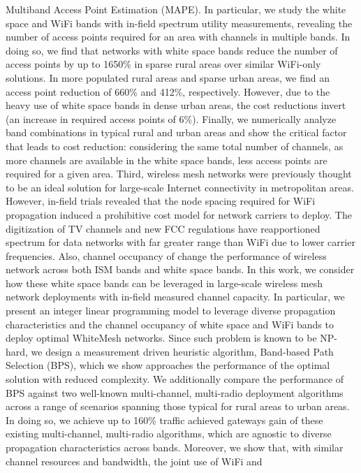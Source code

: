 Multiband Access Point Estimation (MAPE). In particular, we study the white space 
and WiFi bands with in-field spectrum utility measurements, revealing the number 
of access points required for an area with channels in multiple bands. In doing so, 
we find that networks with white space bands reduce the number of access points by 
up to 1650\% in sparse rural areas over similar WiFi-only solutions. In more populated 
rural areas and sparse urban areas, we find an access point reduction of 660\% and 
412\%, respectively.  However, due to the heavy use of white space bands in dense 
urban areas, the cost reductions invert (an increase in required access points 
of 6\%).  Finally, we numerically analyze band combinations in typical rural and 
urban areas and show the critical factor that leads to cost reduction: considering 
the same total number of channels, as more channels are available in the white space 
bands, less access points are required for a given area.
Third, wireless mesh networks were previously thought to be an ideal solution for
large-scale Internet connectivity in metropolitan areas.  However, in-field
trials revealed that the node spacing required for WiFi propagation 
induced a prohibitive cost model for network carriers to deploy. The digitization 
of TV channels and new FCC regulations have reapportioned spectrum for data 
networks with far greater range than WiFi due to lower carrier frequencies. 
Also, channel occupancy of change the performance of wireless network across 
both ISM bands and white space bands. In this work, we consider how these white 
space bands can be leveraged in large-scale wireless mesh network deployments 
with in-field measured channel capacity. In particular, we present an integer 
linear programming model to leverage diverse propagation characteristics and 
the  channel occupancy of white space and WiFi bands to deploy optimal WhiteMesh 
networks. Since such problem is known to be NP-hard, we design a measurement driven 
heuristic algorithm, Band-based Path Selection (BPS), which we show approaches 
the performance of the optimal solution with reduced complexity.  We additionally 
compare the performance of BPS against two well-known multi-channel, multi-radio 
deployment algorithms across a range of scenarios spanning those typical for 
rural areas to urban areas. In doing so, we achieve up to 160\% traffic achieved 
gateways gain of these existing multi-channel, multi-radio algorithms, which are 
agnostic to diverse propagation characteristics across bands.  Moreover, we show 
that, with similar channel resources and bandwidth, the joint use of WiFi and 
